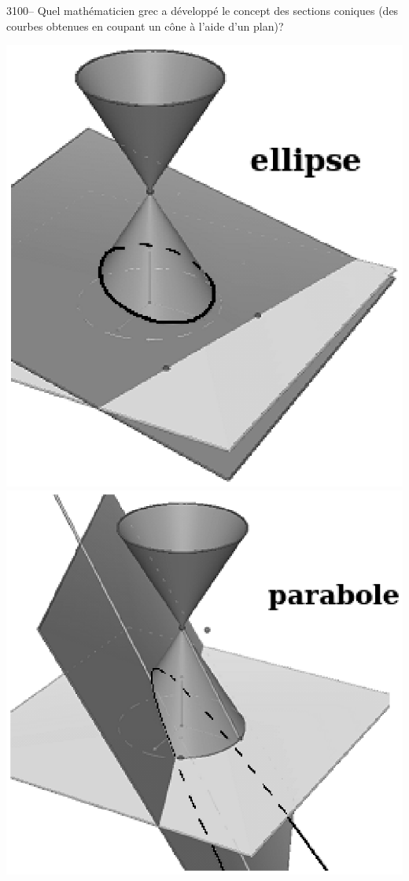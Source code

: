 \documentclass[letterpaper, 12pt]{article}
\begin{document}
3100-- Quel math\'ematicien grec a d\'evelopp\'e le concept des sections coniques (des courbes obtenues en coupant un c\^one \`a l'aide d'un plan)?
\begin{center}
\includegraphics[scale=0.5]{conique_ellipse.eps}
\includegraphics[scale=0.5]{conique_parabole.eps}

\end{center}
\end{document}
